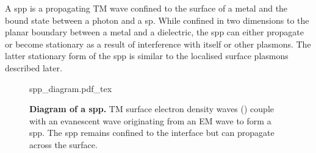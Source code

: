 \documentclass{article}
\begin{document}
A \gls{spp} is a propagating TM wave confined to the surface of a metal and the bound state between a photon and a \gls{sp}. While confined in two dimensions to the planar boundary between a metal and a dielectric, the \gls{spp} can either propagate or become stationary as a result of interference {\color{red}with itself or other plasmons}. The latter stationary form of the \gls{spp} is similar to the localised surface plasmons described later.

\begin{figure}[bt]
\fontsize{10pt}{1em}\selectfont
\def\svgwidth{0.6\textwidth}
{spp_diagram.pdf_tex}
\caption[Diagram of a \acrfull{spp}]{\textbf{Diagram of a \acrfull{spp}.} TM surface electron density waves () couple with an evanescent wave originating from an EM wave to form a \gls{spp}. The \gls{spp} remains confined to the interface but can propagate across the surface.}
\label{fig:spp_diagram}
\end{figure}
\end{document}
